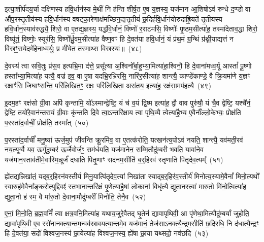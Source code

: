 इत्या॒शीर्प॑दय॒र्चा दक्षि॑णस्य हवि॒र्धान॑स्य मे॒थीं नि ह॑न्ति शीर्\mbox{}ष॒त ए॒व य॒ज्ञस्य॒ यज॑मान आ॒शिषो\-ऽव॑ रुन्धे द॒ण्डो वा औ॑प॒रस्तृ॒तीय॑स्य हवि॒र्धान॑स्य वषट्का॒रेणाक्ष॑मच्छिन॒द्यत्तृ॒तीयं॑ छ॒दिर्\mbox{}ह॑वि॒र्धान॑योरुदाह्रि॒यते॑ तृ॒तीय॑स्य हवि॒र्धान॒स्याव॑रुद्ध्यै॒ शिरो॒ वा ए॒तद्य॒ज्ञस्य॒ यद्ध॑वि॒र्धानं॒ विष्णो॑ र॒राट॑मसि॒ विष्णोः᳚ पृ॒ष्ठम॒सीत्या॑ह॒ तस्मा॑देताव॒द्धा शिरो॒ विष्यू॑तं॒ विष्णोः॒ स्यूर॑सि॒ विष्णो᳚र्ध्रु॒वम॒सीत्या॑ह वैष्ण॒वꣳ हि दे॒वत॑या हवि॒र्धानं॒ यं प्र॑थ॒मं ग्र॒न्थिं ग्र॑थ्नी॒याद्यत्तं न वि॑स्र॒ꣳ॒सये॒दमे॑हेनाध्व॒र्युः प्र मी॑येत॒ तस्मा॒थ्स वि॒स्रस्यः॑॥~(४८)\ip

{\anuvakamend[{पत्नी॑ हन्युर्वा पृथि॒व्या विष्यू॑तं॒ विष्णोः॒ षड्विꣳ॑शतिश्च}]}

दे॒वस्य॑ त्वा सवि॒तुः प्र॑स॒व इत्यभ्रि॒मा द॑त्ते॒ प्रसू᳚त्या अ॒श्विनो᳚र्बा॒हुभ्या॒मित्या॑हा॒श्विनौ॒ हि दे॒वाना॑मध्व॒र्यू आस्तां᳚ पू॒ष्णो हस्ता᳚भ्या॒मित्या॑ह॒ यत्यै॒ वज्र॑ इव॒ वा ए॒षा यदभ्रि॒रभ्रि॑रसि॒ नारि॑र॒सीत्या॑ह॒ शान्त्यै॒ काण्डे॑काण्डे॒ वै क्रि॒यमा॑णे य॒ज्ञꣳ रक्षाꣳ॑सि जिघाꣳसन्ति॒ परि॑लिखित॒ꣳ॒ रक्षः॒ परि॑लिखिता॒ अरा॑तय॒ इत्या॑ह॒ रक्ष॑सा॒मप॑हत्यै~(४९)\ip

इ॒दम॒हꣳ रक्ष॑सो ग्री॒वा अपि॑ कृन्तामि॒ यो᳚\-ऽस्मान्द्वेष्टि॒ यं च॑ व॒यं द्वि॒ष्म इत्या॑ह॒ द्वौ वाव पुरु॑षौ॒ यं चै॒व द्वेष्टि॒ यश्चै॑नं॒ द्वेष्टि॒ तयो॑रे॒वान॑न्तरायं ग्री॒वाः कृ॑न्तति दि॒वे त्वा॒ऽन्तरि॑क्षाय त्वा पृथि॒व्यै त्वेत्या॑है॒भ्य ए॒वैनाँ᳚ल्लो॒केभ्यः॒ प्रोक्ष॑ति प॒रस्ता॑द॒र्वाचीं॒ प्रोक्ष॑ति॒ तस्मा᳚त्~(५०)\ip

प॒रस्ता॑द॒र्वाचीं᳚ मनु॒ष्या॑ ऊर्ज॒मुप॑ जीवन्ति क्रू॒रमि॑व॒ वा ए॒तत्क॑रोति॒ यत्खन॑त्य॒पो\-ऽव॑ नयति॒ शान्त्यै॒ यव॑मती॒रव॑ नय॒त्यूर्ग्वै यव॒ ऊर्गु॑दु॒म्बर॑ ऊ॒र्जैवोर्ज॒ꣳ॒ सम॑र्धयति॒ यज॑मानेन॒ सम्मि॒तौदु॑म्बरी भवति॒ यावा॑ने॒व यज॑मान॒स्ताव॑तीमे॒वास्मि॒न्नूर्जं॑ दधाति पितृ॒णाꣳ सद॑नम॒सीति॑ ब॒र्॒\mbox{}हिरव॑ स्तृणाति पितृदेव॒त्यम्᳚~(५१)\ip

ह्ये॑तद्यन्निखा॑तं॒ यद्ब॒र्॒\mbox{}हिरन॑वस्तीर्य मिनु॒यात्पि॑तृदेव॒त्या॑ निखा॑ता स्याद्ब॒र्॒\mbox{}हिर॑व॒स्तीर्य॑ मिनोत्य॒स्यामे॒वैनां᳚ मिनो॒त्यथो᳚ स्वा॒रुह॑मे॒वैना᳚ङ्करो॒त्युद्दिवꣴ॑ स्तभा॒नान्तरि॑क्षं पृ॒णेत्या॑है॒षां लो॒कानां॒ विधृ॑त्यै द्युता॒नस्त्वा॑ मारु॒तो मि॑नो॒त्वित्या॑ह द्युता॒नो ह॑ स्म॒ वै मा॑रु॒तो दे॒वाना॒मौदु॑म्बरीं मिनोति॒ तेनै॒व~(५२)\ip

ए॒नां॒ मि॒नो॒ति॒ ब्र॒ह्म॒वनिं᳚ त्वा क्षत्र॒वनि॒मित्या॑ह यथाय॒जुरे॒वैतद् घृ॒तेन॑ द्यावा\-पृथिवी॒ आ पृ॑णेथा॒मित्यौदु॑म्बर्यां जुहोति॒ द्यावा॑\-पृथि॒वी ए॒व रसे॑नानक्त्या॒न्तम॒न्वव॑स्रावयत्या॒न्तमे॒व यज॑मानं॒ तेज॑सा\-ऽनक्त्यै॒न्द्रम॒सीति॑ छ॒दिरधि॒ नि द॑धात्यै॒न्द्रꣳ हि दे॒वत॑या॒ सदो॑ विश्वज॒नस्य॑ छा॒येत्या॑ह विश्वज॒नस्य॒ ह्ये॑षा छा॒या यथ्सदो॒ नव॑छदि~(५३)\ip

